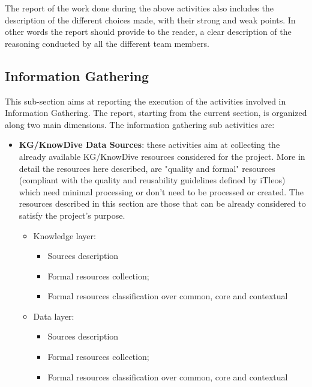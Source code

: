 \noindent The report of the work done during the above activities also includes the description of the  different choices made, with their strong and weak points. In other words the report should provide to the reader, a clear description of the reasoning conducted by all the different team members.

\subsection{Information Gathering}
This sub-section aims at reporting the execution of the activities involved in Information Gathering. The report, starting from the current section, is organized along two main dimensions. The information gathering sub activities are:
\begin{itemize}
    \item \textbf{KG/KnowDive Data Sources}: these activities aim at collecting the already available KG/KnowDive resources considered for the project. More in detail the resources here described, are "quality and formal" resources (compliant with the quality and reusability guidelines defined by iTleos) which need minimal processing or don't need to be processed or created. The resources described in this section are those that can be already considered to satisfy the project's purpose.
    
    \begin{itemize}
        \item Knowledge layer:
        \begin{itemize}
            \item Sources description
            \item Formal resources collection;
            \item Formal resources classification over common, core and contextual
        \end{itemize}
        \item Data layer:
        \begin{itemize}
            \item Sources description
            \item Formal resources collection;
            \item Formal resources classification over common, core and contextual
        \end{itemize}
    \end{itemize}


\end{itemize}
